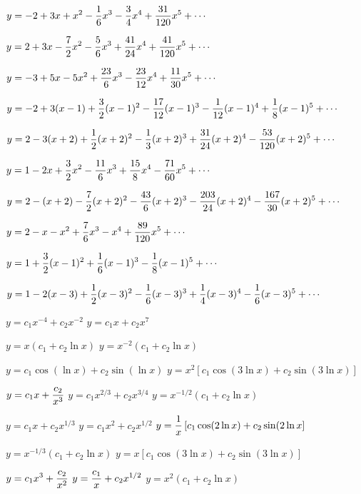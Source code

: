 $y=\displaystyle{-2+3x+x^2-\frac{1}{6}x^3-\frac{3}{4}x^4+\frac{31}{120}x^5+\cdots}$

$y=\displaystyle{2+3x-\frac{7}{2}x^2-\frac{5}{6}x^3+\frac{41}{24}x^4+\frac{41}{120}x^5+\cdots}$

$y=\displaystyle{-3+5x-5x^2+\frac{23}{6}x^3-\frac{23}{12}x^4+\frac{11}{30}x^5+\cdots}$

$y=\displaystyle{-2+3(x-1)+\frac{3}{2}(x-1)^2-\frac{17}{12}(x-1)^3-\frac{1}{12}(x-1)^4+
\frac{1}{8}(x-1)^5+\cdots}$

$y=\displaystyle{2-3(x+2)+\frac{1}{2}(x+2)^2-\frac{1}{3}(x+2)^3+\frac{31}{24}(x+2)^4-
\frac{53}{120}(x+2)^5+\cdots}$

$y=\displaystyle{1-2x+\frac{3}{2}x^2-\frac{11}{6}x^3+\frac{15}{8}x^4-\frac{71}{60}x^5+\cdots}$

$y=\displaystyle{2-(x+2)-\frac{7}{2}(x+2)^2-\frac{43}{6}(x+2)^3-\frac{203}{24}(x+2)^4-\frac{167}{30}(x+2)^5+\cdots}$

$y=\displaystyle{2-x-x^2+\frac{7}{6}x^3-x^4+\frac{89}{120}x^5+\cdots}$

$y=\displaystyle{1+\frac{3}{2}(x-1)^2+\frac{1}{6}(x-1)^3-\frac{1}{8}(x-1)^5+\cdots}$

$y=\displaystyle{1-2(x-3)+\frac{1}{2}(x-3)^2-\frac{1}{6}(x-3)^3+\frac{1}{4}(x-3)^4
-\frac{1}{6}(x-3)^5+\cdots}$



 $y=c_1x^{-4}+c_2x^{-2}$
  $y=c_1x+c_2x^7$

 $y=x(c_1+c_2 \ln x)$
 $y=x^{-2}(c_1+c_2 \ln x)$

 $y=c_1 \cos (\ln x)+c_2 \sin (\ln x)$
 $y=x^2[c_1 \cos (3 \ln x)+c_2 \sin (3 \ln x)]$

 $y=\displaystyle{c_1x+\frac{c_2}{x^3}}$
$y=c_1x^{2/3}+c_2 x^{3/4}$
 $y=x^{-1/2} (c_1+c_2 \ln x)$

 $y=c_1x+c_2x^{1/3}$
 $y=c_1x^2+c_2 x^{1/2}$
$y=\displaystyle{\frac{1}{x}\left[c_1\cos(2 \ln x)+c_2\sin(2 \ln x\right]}$

 $y=x^{-1/3} (c_1+c_2 \ln x)$
 $y=x\left[c_1\cos(3 \ln x)+c_2\sin(3 \ln
x)\right]$

 $y=\displaystyle{c_1x^3+\frac{c_2}{x^2}}$
$y=\displaystyle{\frac{c_1}{x}+c_2 x^{1/2}}$
 $y=x^2(c_1+c_2 \ln x)$


